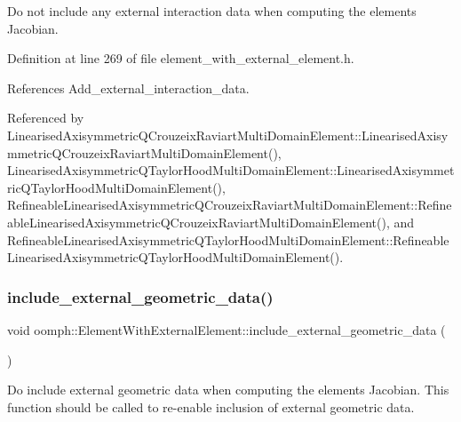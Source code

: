 Do not include any external interaction data when computing the element\textquotesingle{}s Jacobian. 



Definition at line 269 of file element\+\_\+with\+\_\+external\+\_\+element.\+h.



References Add\+\_\+external\+\_\+interaction\+\_\+data.



Referenced by Linearised\+Axisymmetric\+Q\+Crouzeix\+Raviart\+Multi\+Domain\+Element\+::\+Linearised\+Axisymmetric\+Q\+Crouzeix\+Raviart\+Multi\+Domain\+Element(), Linearised\+Axisymmetric\+Q\+Taylor\+Hood\+Multi\+Domain\+Element\+::\+Linearised\+Axisymmetric\+Q\+Taylor\+Hood\+Multi\+Domain\+Element(), Refineable\+Linearised\+Axisymmetric\+Q\+Crouzeix\+Raviart\+Multi\+Domain\+Element\+::\+Refineable\+Linearised\+Axisymmetric\+Q\+Crouzeix\+Raviart\+Multi\+Domain\+Element(), and Refineable\+Linearised\+Axisymmetric\+Q\+Taylor\+Hood\+Multi\+Domain\+Element\+::\+Refineable\+Linearised\+Axisymmetric\+Q\+Taylor\+Hood\+Multi\+Domain\+Element().

\mbox{\label{classoomph_1_1ElementWithExternalElement_a1e91155332a266a1672791e8711c409d}} 
\subsubsection{\texorpdfstring{include\+\_\+external\+\_\+geometric\+\_\+data()}{include\_external\_geometric\_data()}}
{\footnotesize\ttfamily void oomph\+::\+Element\+With\+External\+Element\+::include\+\_\+external\+\_\+geometric\+\_\+data (\begin{DoxyParamCaption}{ }\end{DoxyParamCaption})\hspace{0.3cm}{\ttfamily [inline]}}



Do include external geometric data when computing the element\textquotesingle{}s Jacobian. This function should be called to re-\/enable inclusion of external geometric data. 



